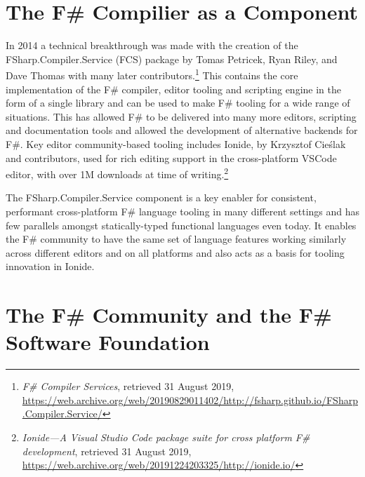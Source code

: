 \documentclass[acmsmall]{acmart}\settopmatter{}
\begin{document}
\section*{The F\# Compilier as a Component}

In 2014 a technical breakthrough was made with the creation of the FSharp.Compiler.Service (FCS) package by
Tomas Petricek, Ryan Riley, and Dave Thomas with many later contributors.\footnote{\textit{F\# Compiler Services}, retrieved 31
August 2019, \url{https://web.archive.org/web/20190829011402/http://fsharp.github.io/FSharp.Compiler.Service/}}
This contains the core implementation of the F\# compiler, editor tooling and scripting engine in the form of a single library and can be used to make F\# tooling
for a wide range of situations.  This has allowed F\# to be delivered into many more editors, scripting and documentation
tools and allowed the development of alternative backends for F\#.   Key editor community-based tooling includes
Ionide, by Krzysztof Cieślak and contributors, used for rich editing support in the cross-platform VSCode editor, with over 1M downloads at time
of writing.\footnote{\textit{Ionide---A Visual Studio Code package suite for cross platform F\# development}, retrieved 31 August 2019, \url{https://web.archive.org/web/20191224203325/http://ionide.io/}}

The FSharp.Compiler.Service component is a key enabler for consistent, performant cross-platform F\# language tooling in many different settings and
has few parallels amongst statically-typed  functional languages even today. It enables the F\# community to have the same set of language features working
similarly across different editors and on all platforms and also acts as a basis for tooling innovation in Ionide.

\section*{The F\# Community and the F\# Software Foundation }

\label{page:community}
\end{document}
